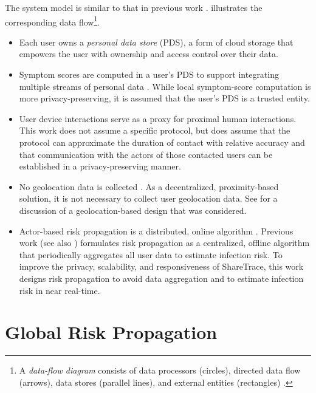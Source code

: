 The system model is similar to that in previous work \cite{Ayday2020, Ayday2021}.  illustrates the corresponding data flow\footnote{A \emph{data-flow diagram} consists of data processors (circles), directed data flow (arrows), data stores (parallel lines), and external entities (rectangles) \cite[pp. 437--438]{Fowler2004}\label{foot:dataflow}.}.
%
\begin{itemize}
    \item Each user owns a \emph{personal data store} (PDS), a form of cloud storage that empowers the user with ownership and access control over their data.
    \item Symptom scores are computed in a user's PDS to support integrating multiple streams of personal data \cite{Ayday2020}. While local symptom-score computation \cite{Ayday2020, Ayday2021} is more privacy-preserving, it is assumed that the user's PDS is a trusted entity.
    \item User device interactions serve as a proxy for proximal human interactions. This work does not assume a specific protocol, but does assume that the protocol can approximate the duration of contact with relative accuracy and that communication with the actors of those contacted users can be established in a privacy-preserving manner.
    \item No geolocation data is collected \cite{Ayday2020}. As a decentralized, proximity-based solution, it is not necessary to collect user geolocation data. See  for a discussion of a geolocation-based design that was considered.
    \item Actor-based risk propagation is a distributed, online algorithm \cite[pp. 791--818]{Cormen2022}. Previous work \cite{Ayday2020, Ayday2021} (see also ) formulates risk propagation as a centralized, offline algorithm that periodically aggregates all user data to estimate infection risk. To improve the privacy, scalability, and responsiveness of ShareTrace, this work designs risk propagation to avoid data aggregation and to estimate infection risk in near real-time.
\end{itemize}
%

\section{Global Risk Propagation}

